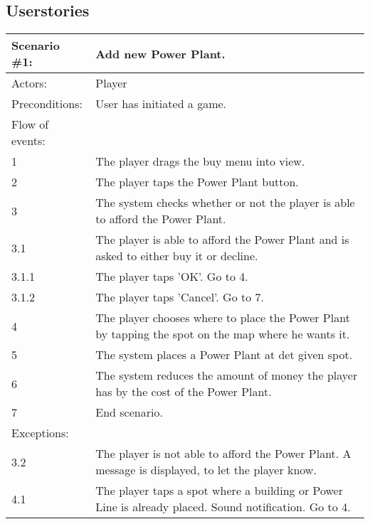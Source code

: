 \subsection{Userstories}


\begin{tabular}{| l | p{10cm} |}
	\hline
	{\bf Scenario \#1:} & {\bf Add new Power Plant.} \\ \hline
	Actors: & Player \\ \hline
	Preconditions: & User has initiated a game. \\ \hline
	Flow of events: &  \\ \hline
	1 & The player drags the buy menu into view. \\ \hline
	2 & The player taps the Power Plant button. \\ \hline
	3 & The system checks whether or not the player is able to afford the Power Plant. \\ \hline
	3.1 & The player is able to afford the Power Plant and is asked to either buy it or decline. \\ \hline
	3.1.1 & The player taps 'OK'. Go to 4. \\ \hline
	3.1.2 & The player taps 'Cancel'. Go to 7. \\ \hline
	4 & The player chooses where to place the Power Plant by tapping the spot on the map where he wants it. \\ \hline
	5 & The system places a Power Plant at det given spot. \\ \hline
	6 & The system reduces the amount of money the player has by the cost of the Power Plant. \\ \hline
	7 & End scenario. \\ \hline
	Exceptions: & \\ \hline
	3.2 & The player is not able to afford the Power Plant. A message is displayed, to let the player know. \\ \hline
	4.1 & The player taps a spot where a building or Power Line is already placed. Sound notification. Go to 4. \\ \hline
\end{tabular}

